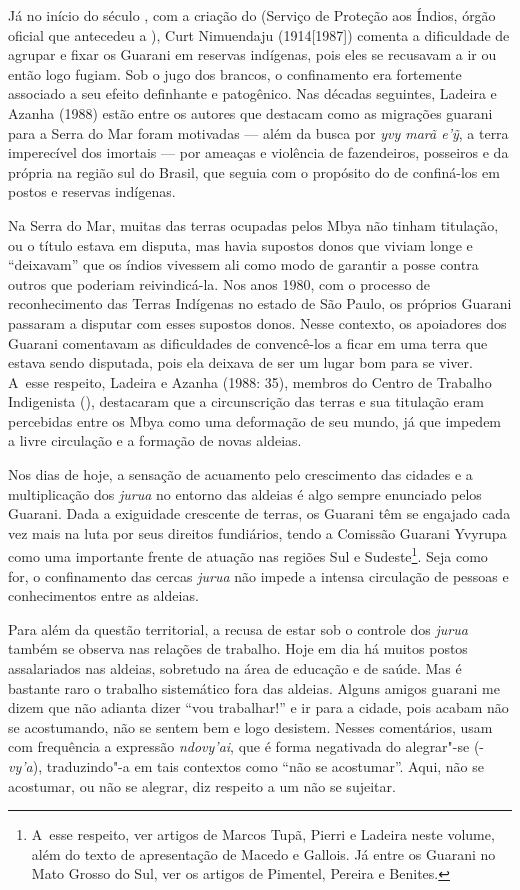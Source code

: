 Já no início do século , com a criação do  (Serviço de Proteção aos
Índios, órgão oficial que antecedeu a ), Curt Nimuendaju
(1914[1987]) comenta a dificuldade de agrupar e fixar os Guarani em
reservas indígenas, pois eles se recusavam a ir ou então logo fugiam.
Sob o jugo dos brancos, o confinamento era fortemente associado a seu
efeito definhante e patogênico. Nas décadas seguintes, Ladeira e Azanha
(1988) estão entre os autores que destacam como as migrações guarani
para a Serra do Mar foram motivadas --- além da busca por \emph{yvy marã
e’\~{y}}, a terra imperecível dos imortais --- por ameaças e violência de
fazendeiros, posseiros e da própria  na região sul do Brasil, que
seguia com o propósito do  de confiná-los em postos e reservas
indígenas.

Na Serra do Mar, muitas das terras ocupadas pelos Mbya não tinham
titulação, ou o título estava em disputa, mas havia supostos donos que
viviam longe e ``deixavam'' que os índios vivessem ali como modo de
garantir a posse contra outros que poderiam reivindicá-la. Nos anos
1980, com o processo de reconhecimento das Terras Indígenas no estado
de São Paulo, os próprios Guarani passaram a disputar com esses
supostos donos. Nesse contexto, os apoiadores dos Guarani comentavam as
dificuldades de convencê-los a ficar em uma terra que estava sendo
disputada, pois ela deixava de ser um lugar bom para se viver. A~esse
respeito, Ladeira e Azanha (1988: 35), membros do Centro de Trabalho
Indigenista (), destacaram que a circunscrição das terras e sua
titulação eram percebidas entre os Mbya como uma deformação de seu
mundo, já que impedem a livre circulação e a formação de novas aldeias.

Nos dias de hoje, a sensação de acuamento pelo crescimento das cidades e
a multiplicação dos \emph{jurua} no entorno das aldeias é algo sempre
enunciado pelos Guarani. Dada a exiguidade crescente de terras, os
Guarani têm se engajado cada vez mais na luta por seus direitos
fundiários, tendo a Comissão Guarani Yvyrupa como uma importante frente
de atuação nas regiões Sul e Sudeste\footnote{A~esse respeito, ver
artigos de Marcos Tupã, Pierri e Ladeira neste volume, além do texto de
apresentação de Macedo e Gallois. Já entre os Guarani no Mato Grosso do
Sul, ver os artigos de Pimentel, Pereira e Benites.}. Seja como for, o
confinamento das cercas \emph{jurua} não impede a intensa circulação de
pessoas e conhecimentos entre as aldeias. 

Para além da questão territorial, a recusa de estar sob o controle dos
\emph{jurua} também se observa nas relações de trabalho. Hoje em dia há muitos
postos assalariados nas aldeias, sobretudo na área de educação e de
saúde. Mas é bastante raro o trabalho sistemático fora das aldeias.
Alguns amigos guarani me dizem que não adianta dizer ``vou trabalhar!'' e
ir para a cidade, pois acabam não se acostumando, não se sentem bem e
logo desistem. Nesses comentários, usam com frequência a expressão
\emph{ndovy’ai}, que é forma negativada do alegrar"-se (-\emph{vy'a}), traduzindo"-a em
tais contextos como ``não se acostumar''. Aqui, não se acostumar, ou não
se alegrar, diz respeito a um não se sujeitar.

